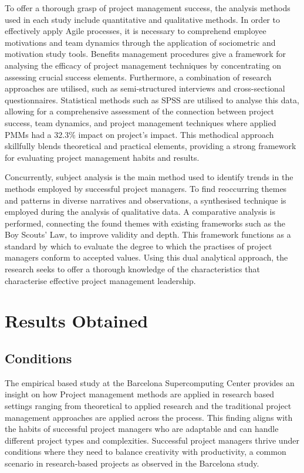 \documentclass{article}
\begin{document}
To offer a thorough grasp of project management success, the analysis methods used in each study include quantitative and qualitative methods. In order to effectively apply Agile processes, it is necessary to comprehend employee motivations and team dynamics through the application of sociometric and motivation study tools. Benefits management procedures give a framework for analysing the efficacy of project management techniques by concentrating on assessing crucial success elements. Furthermore, a combination of research approaches are utilised, such as semi-structured interviews and cross-sectional questionnaires. Statistical methods such as SPSS are utilised to analyse this data, allowing for a comprehensive assessment of the connection between project success, team dynamics, and project management techniques where applied PMMs had a 32.3\% impact on project's impact. This methodical approach skillfully blends theoretical and practical elements, providing a strong framework for evaluating project management habits and results.

Concurrently, subject analysis is the main method used to identify trends in the methods employed by successful project managers. To find reoccurring themes and patterns in diverse narratives and observations, a synthesised technique is employed during the analysis of qualitative data. A comparative analysis is performed, connecting the found themes with existing frameworks such as the Boy Scouts' Law, to improve validity and depth. This framework functions as a standard by which to evaluate the degree to which the practises of project managers conform to accepted values. Using this dual analytical approach, the research seeks to offer a thorough knowledge of the characteristics that characterise effective project management leadership.



\section{Results Obtained}
\subsection{Conditions}

The empirical based study at the Barcelona Supercomputing Center provides an insight on how Project management methods are applied in research based settings ranging from theoretical to applied research and the traditional project management approaches are applied across the process. This finding aligns with the habits of successful project managers who are adaptable and can handle different project types and complexities. Successful project managers thrive under conditions where they need to balance creativity with productivity, a common scenario in research-based projects as observed in the Barcelona study.
\end{document}
